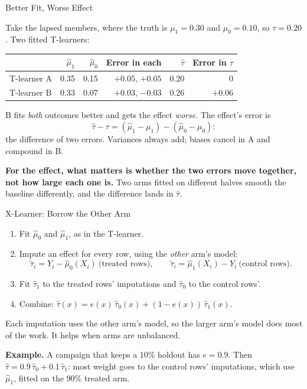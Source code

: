 \documentclass[aspectratio=169, 11pt, handout]{beamer}
\newcommand{\hatt}{\hat{\tau}}
\begin{document}
\begin{frame}{Better Fit, Worse Effect}

Take the lapsed members, where the truth is $\mu_1 = 0.30$ and $\mu_0 = 0.10$, so $\tau = 0.20$. Two fitted T-learners:

\begin{center}
\begin{tabular}{lrrrrr}
\toprule
& $\widehat\mu_1$ & $\widehat\mu_0$ & \textbf{Error in each} & $\widehat\tau$ & \textbf{Error in $\tau$} \\
\midrule
T-learner A & 0.35 & 0.15 & $+0.05$, $+0.05$ & 0.20 & \textcolor{sbgreen}{0} \\
T-learner B & 0.33 & 0.07 & $+0.03$, $-0.03$ & 0.26 & \textcolor{warnred}{$+0.06$} \\
\bottomrule
\end{tabular}
\end{center}

\bigskip

B fits \emph{both} outcomes better and gets the effect \emph{worse}. The effect's error is
\[
\widehat\tau - \tau = (\widehat\mu_1 - \mu_1) - (\widehat\mu_0 - \mu_0) :
\]
the difference of two errors. Variances always add; biases cancel in A and compound in B.

\medskip

\textbf{For the effect, what matters is whether the two errors move together, not how large each one is.} Two arms fitted on different halves smooth the baseline differently, and the difference lands in $\hatt$.
\end{frame}

\begin{frame}{X-Learner: Borrow the Other Arm}

\begin{enumerate}
  \item Fit $\hat\mu_0$ and $\hat\mu_1$, as in the T-learner.
  \item Impute an effect for every row, using the \emph{other} arm's model:
  \[
  \tilde\tau_i = Y_i - \hat\mu_0(X_i) \ \text{(treated rows)}, \qquad \tilde\tau_i = \hat\mu_1(X_i) - Y_i \ \text{(control rows)}.
  \]
  \item Fit $\hatt_1$ to the treated rows' imputations and $\hatt_0$ to the control rows'.
  \item Combine: $\hatt(x) = e(x)\,\hatt_0(x) + (1 - e(x))\,\hatt_1(x)$.
\end{enumerate}

\bigskip

Each imputation uses the other arm's model, so the larger arm's model does most of the work. It helps when arms are unbalanced.

\medskip

\textbf{Example.} A campaign that keeps a 10\% holdout has $e = 0.9$. Then $\hatt = 0.9\,\hatt_0 + 0.1\,\hatt_1$: most weight goes to the control rows' imputations, which use $\hat\mu_1$, fitted on the 90\% treated arm.
\end{frame}
\end{document}
